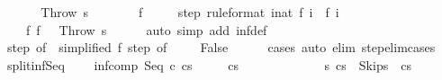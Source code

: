 \begin{isabellebody}
\isamarkupfalse%
\ \isanewline
\ \ \isamarkupfalse%
\ {\isachardoublequoteopen}{\isasymGamma}{\isasymturnstile}\ {\isacharparenleft}Throw{\isacharcomma}\ s{\isacharparenright}\ {\isasymrightarrow}\ {\isasymdots}{\isacharparenleft}{\isasyminfinity}{\isacharparenright}{\isachardoublequoteclose}\isanewline
\ \ \isamarkupfalse%
\ \isamarkupfalse%
\ f\ \isanewline
\ \ \ \ step\ {\isacharbrackleft}rule{\isacharunderscore}format{\isacharbrackright}{\isacharcolon}\ {\isachardoublequoteopen}{\isasymforall}i{\isacharcolon}{\isacharcolon}nat{\isachardot}\ {\isasymGamma}{\isasymturnstile}f\ i\ {\isasymrightarrow}\ f\ {\isacharparenleft}i{\isacharplus}{}{\isacharparenright}{\isachardoublequoteclose}\ \isanewline
\ \ \ \ f{\isacharunderscore}{}{\isacharcolon}\ {\isachardoublequoteopen}f\ {}\ {\isacharequal}\ {\isacharparenleft}Throw{\isacharcomma}\ s{\isacharparenright}{\isachardoublequoteclose}\isanewline
\ \ \ \ \isamarkupfalse%
\ {\isacharparenleft}auto\ simp\ add{\isacharcolon}\ inf{\isacharunderscore}def{\isacharparenright}\isanewline
\ \ \isamarkupfalse%
\ step\ {\isacharbrackleft}of\ {}{\isacharcomma}\ simplified\ f{\isacharunderscore}{}{\isacharbrackright}\ step\ {\isacharbrackleft}of\ {}{\isacharbrackright}\isanewline
\ \ \isamarkupfalse%
\ False\isanewline
\ \ \ \ \isamarkupfalse%
\ cases\ {\isacharparenleft}auto\ elim{\isacharcolon}\ step{\isacharunderscore}elim{\isacharunderscore}cases{\isacharparenright}\isanewline
{}\isamarkupfalse%
%
\endisatagproof
{\isafoldproof}%
%
\isadelimproof
\isanewline
%
\endisadelimproof
\isanewline
{}\isamarkupfalse%
\ split{\isacharunderscore}inf{\isacharunderscore}Seq{\isacharcolon}\ \isanewline
\ \ \ inf{\isacharunderscore}comp{\isacharcolon}\ {\isachardoublequoteopen}{\isasymGamma}{\isasymturnstile}{\isacharparenleft}Seq\ c\ cs{\isacharparenright}\ {\isasymrightarrow}\ {\isasymdots}{\isacharparenleft}{\isasyminfinity}{\isacharparenright}{\isachardoublequoteclose}\isanewline
\ \ \ {\isachardoublequoteopen}{\isasymGamma}{\isasymturnstile}{\isacharparenleft}cs{\isacharparenright}\ {\isasymrightarrow}\ {\isasymdots}{\isacharparenleft}{\isasyminfinity}{\isacharparenright}\ {\isasymor}\ \isanewline
\ \ \ \ \ \ \ \ \ {\isacharparenleft}{\isasymexists}s{\isacharprime}{\isachardot}\ {\isasymGamma}{\isasymturnstile}{\isacharparenleft}cs{\isacharparenright}\ {\isasymrightarrow}\isactrlsup {\isacharasterisk}\ {\isacharparenleft}Skip{\isacharcomma}s{\isacharprime}{\isacharparenright}\ {\isasymand}\ {\isasymGamma}{\isasymturnstile}{\isacharparenleft}cs{\isacharprime}{\isacharparenright}\ {\isasymrightarrow}\ {\isasymdots}{\isacharparenleft}{\isasyminfinity}{\isacharparenright}{\isacharparenright}{\isachardoublequoteclose}\isanewline

\end{isabellebody}
